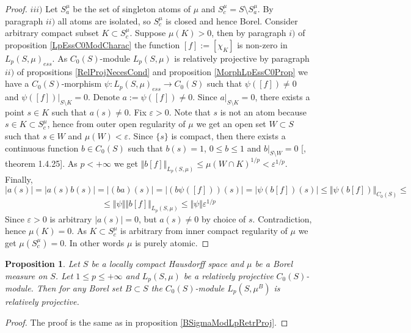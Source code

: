 \documentclass[12pt]{article}
\newtheorem{proposition}[theorem]{Proposition}
\begin{document}
\begin{proof}
    $iii)$ Let $S_a^\mu$ be the set of singleton atoms of $\mu$ and $S_c^\mu=S\setminus S_a^\mu$. By paragraph $ii)$ all atoms are isolated, so $S_c^\mu$ is closed and hence Borel. Consider arbitrary compact subset $K\subset S_c^\mu$. Suppose $\mu(K)>0$, then by paragraph $i)$ of proposition \ref{LpEssC0ModCharac} the function $[f]:=[\chi_K]$ is non-zero in $L_p(S,\mu)_{ess}$. As $C_0(S)$-module $L_p(S, \mu)$ is relatively projective by paragraph $ii)$ of propositions \ref{RelProjNecesCond} and proposition \ref{MorphLpEssC0Prop} we have a $C_0(S)$-morphism $\psi:L_p(S,\mu)_{ess}\to C_0(S)$ such that $\psi([f])\neq 0$ and $\psi([f])|_{S\setminus K}=0$. Denote $a:=\psi([f])\neq 0$. Since $a|_{S\setminus K}=0$, there exists a point $s\in K$ such that $a(s)\neq 0$. Fix $\varepsilon > 0$. Note that $s$ is not an atom because $s\in K\subset S_c^\mu$, hence from outer open regularity of $\mu$ we get an open set $W\subset S$ such that $s\in W$ and $\mu(W)<\varepsilon$. Since $\{s\}$ is compact, then there exists a continuous function $b\in C_0(S)$ such that $b(s)=1$, $0\leq b\leq 1$ and $b|_{S\setminus W}=0$ [\cite{DalesBanSpContFunDualSp}, theorem 1.4.25]. As $p<+\infty$ we get $\Vert b[f]\Vert_{L_p(S,\mu)} \leq \mu(W\cap K)^{1/p}<\varepsilon^{1/p}$. Finally,
    $$
        |a(s)|=|a(s)b(s)|=|(ba)(s)|=|(b\psi([f]))(s)|=|\psi(b[f])(s)|\leq\Vert \psi (b[f])\Vert_{C_0(S)}\leq
    $$
    $$
        \leq\Vert\psi\Vert\Vert b[f]\Vert_{L_p(S,\mu)}\leq\Vert\psi\Vert\varepsilon^{1/p}
    $$
    Since $\varepsilon>0$ is arbitrary $|a(s)|=0$, but $a(s)\neq 0$ by choice of $s$. Contradiction, hence $\mu(K)=0$. As $K\subset S_c^\mu$ is arbitrary from inner compact regularity of $\mu$ we get $\mu(S_c^\mu)=0$. In other words $\mu$ is purely atomic.
\end{proof}

\begin{proposition}\label{C0ModLpRetrProj} Let $S$ be a locally compact Hausdorff space and $\mu$ be a Borel measure on $S$. Let $1\leq p\leq +\infty$ and $L_p(S,\mu)$ be a relatively projective $C_0(S)$-module. Then for any Borel set $B\subset S$ the $C_0(S)$-module $L_p(S,\mu^B)$ is relatively projective.
\end{proposition}
\begin{proof} The proof is the same as in proposition \ref{BSigmaModLpRetrProj}.
\end{proof}
\end{document}
